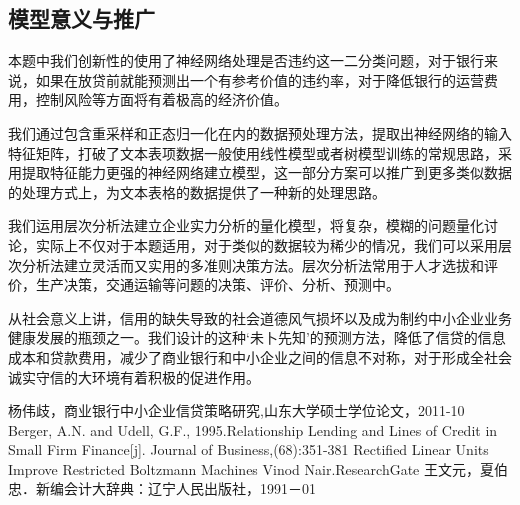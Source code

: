 \documentclass{cumcmthesis}
\begin{document}
\subsection{模型意义与推广}
本题中我们创新性的使用了神经网络处理是否违约这一二分类问题，对于银行来说，如果在放贷前就能预测出一个有参考价值的违约率，对于降低银行的运营费用，控制风险等方面将有着极高的经济价值。

我们通过包含重采样和正态归一化在内的数据预处理方法，提取出神经网络的输入特征矩阵，打破了文本表项数据一般使用线性模型或者树模型训练的常规思路，采用提取特征能力更强的神经网络建立模型，这一部分方案可以推广到更多类似数据的处理方式上，为文本表格的数据提供了一种新的处理思路。

我们运用层次分析法建立企业实力分析的量化模型，将复杂，模糊的问题量化讨论，实际上不仅对于本题适用，对于类似的数据较为稀少的情况，我们可以采用层次分析法建立灵活而又实用的多准则决策方法。层次分析法常用于人才选拔和评价，生产决策，交通运输等问题的决策、评价、分析、预测中。

从社会意义上讲，信用的缺失导致的社会道德风气损坏以及成为制约中小企业业务健康发展的瓶颈之一。我们设计的这种‘未卜先知’的预测方法，降低了信贷的信息成本和贷款费用，减少了商业银行和中小企业之间的信息不对称，对于形成全社会诚实守信的大环境有着积极的促进作用。


\begin{thebibliography}{9}%
    \bibitem[1]杨伟歧，商业银行中小企业信贷策略研究,山东大学硕士学位论文，2011-10
    \bibitem[2]Berger, A.N. and Udell, G.F., 1995.Relationship Lending and Lines of Credit in Small Firm Finance[j]. Journal of Business,(68):351-381
    \bibitem[3]Rectified Linear Units Improve Restricted Boltzmann Machines Vinod Nair.ResearchGate
    \bibitem[4]王文元，夏伯忠．新编会计大辞典：辽宁人民出版社，1991－01
\end{thebibliography}
\end{document}
